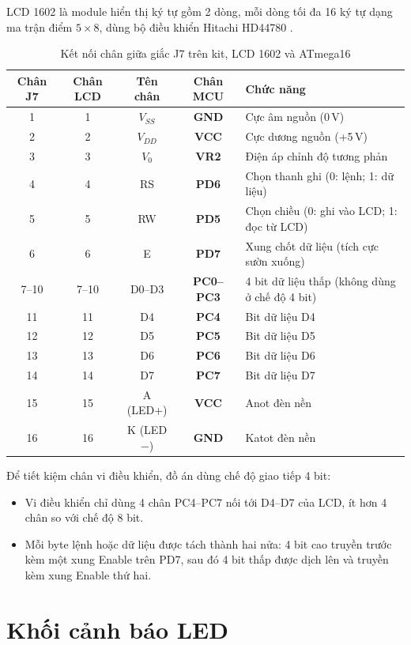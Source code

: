 LCD 1602 là module hiển thị ký tự gồm 2 dòng, mỗi dòng tối đa 16 ký tự dạng ma trận điểm $5 \times 8$, dùng bộ điều khiển Hitachi HD44780 \cite{hd44780-datasheet}.

\begin{table}[H]
\centering
\caption{Kết nối chân giữa giắc J7 trên kit, LCD 1602 và ATmega16}
\label{tab:lcd-pinout}
\begin{tabularx}{\textwidth}{c c c >{\bfseries}c X}
\toprule
Chân J7 & Chân LCD & Tên chân & Chân MCU & Chức năng \\
\midrule
1 & 1 & $V_{SS}$ & GND & Cực âm nguồn (0\,V) \\
2 & 2 & $V_{DD}$ & VCC & Cực dương nguồn (+5\,V) \\
3 & 3 & $V_0$ & VR2 & Điện áp chỉnh độ tương phản \\
4 & 4 & RS & PD6 & Chọn thanh ghi (0: lệnh; 1: dữ liệu) \\
5 & 5 & RW & PD5 & Chọn chiều (0: ghi vào LCD; 1: đọc từ LCD) \\
6 & 6 & E & PD7 & Xung chốt dữ liệu (tích cực sườn xuống) \\
7--10 & 7--10 & D0--D3 & PC0--PC3 & 4 bit dữ liệu thấp (không dùng ở chế độ 4 bit) \\
11 & 11 & D4 & PC4 & Bit dữ liệu D4 \\
12 & 12 & D5 & PC5 & Bit dữ liệu D5 \\
13 & 13 & D6 & PC6 & Bit dữ liệu D6 \\
14 & 14 & D7 & PC7 & Bit dữ liệu D7 \\
15 & 15 & A (LED+) & VCC & Anot đèn nền \\
16 & 16 & K (LED$-$) & GND & Katot đèn nền \\
\bottomrule
\end{tabularx}
\end{table}

Để tiết kiệm chân vi điều khiển, đồ án dùng chế độ giao tiếp 4 bit:
\begin{itemize}[leftmargin=1.2cm]
    \item Vi điều khiển chỉ dùng 4 chân PC4--PC7 nối tới D4--D7 của LCD, ít hơn 4 chân so với chế độ 8 bit.
    \item Mỗi byte lệnh hoặc dữ liệu được tách thành hai nửa: 4 bit cao truyền trước kèm một xung Enable trên PD7, sau đó 4 bit thấp được dịch lên và truyền kèm xung Enable thứ hai.
\end{itemize}

\section{Khối cảnh báo LED}

